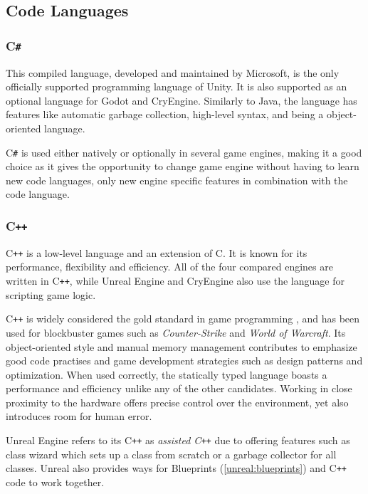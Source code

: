 \subsection{Code Languages}
\subsubsection{C\texttt{\#}} \label{csharp}
This compiled language, developed and maintained by Microsoft, is the only officially supported programming language of Unity. \cite{unity_technologies_2021} It is also supported as an optional language for Godot and CryEngine. Similarly to Java, the language has features like automatic garbage collection, high-level syntax, and being a object-oriented language.

 C\texttt{\#} is used either natively or optionally in several game engines, making it a good choice as it gives the opportunity to change game engine without having to learn new code languages, only new engine specific features in combination with the code language.

\subsubsection{C\texttt{++}} \label{cpp}
C\texttt{++} is a low-level language and an extension of C. It is known for its performance, flexibility and efficiency. 
All of the four compared engines are written in C\texttt{++}, while Unreal Engine and CryEngine also use the language for scripting game logic.

C\texttt{++} is widely considered the gold standard in game programming \cite{terziyan_2020}, and has been used for blockbuster games such as \textit{Counter-Strike} and \textit{World of Warcraft}. Its object-oriented style and manual memory management contributes to emphasize good code practises and game development strategies such as design patterns and optimization. When used correctly, the statically typed language boasts a performance and efficiency unlike any of the other candidates. Working in close proximity to the hardware offers precise control over the environment, yet also introduces room for human error. 

Unreal Engine refers to its C\texttt{++} as \textit{assisted C\texttt{++}} due to offering features such as class wizard which sets up a class from scratch or a garbage collector for all classes. Unreal also provides ways for Blueprints (\ref{unreal:blueprints}) and C\texttt{++} code to work together.
\cite{unreal_engine_documentation_2021}


